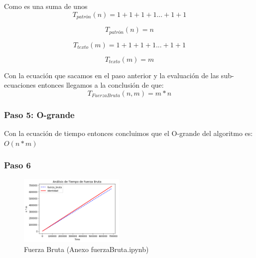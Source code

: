 Como es una suma de unos
\[T_{patrón}(n) = 1 + 1 + 1 + 1 ... + 1 + 1\]

\[T_{patrón}(n) = n \]

\[T_{texto}(m) = 1 + 1 + 1 + 1 ... + 1 + 1\]

\[T_{texto}(m) = m \]

Con la ecuación que sacamos en el paso anterior y la evaluación de las sub-ecuaciones entonces llegamos a la conclusión de que:
\[T_{Fuerza Bruta}(n,m) = m*n\]


\subsubsection*{Paso 5: O-grande}
Con la ecuación de tiempo entonces concluimos que el O-grande del algoritmo es: $O(n*m)$

\subsubsection*{Paso 6}

\begin{figure} [H]
    \includegraphics[width=0.45\textwidth]{../codigoPythonJupyter/FuerzaBruta/Final.png}
    \caption{Fuerza Bruta (Anexo fuerzaBruta.ipynb)}
    \label{fig:fb}
\end{figure}
